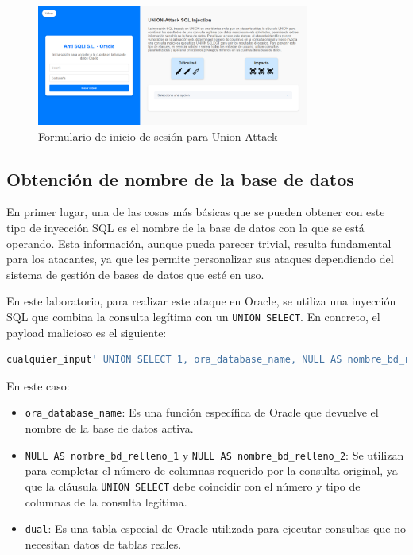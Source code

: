 \documentclass[a4paper,12pt]{article}
\begin{document}
\begin{figure}[H]
    \centering
    \includegraphics[width=0.8\textwidth]{Imagenes/union2.png}
    \caption{Formulario de inicio de sesión para Union Attack}
\end{figure}

\subsection{Obtención de nombre de la base de datos}
En primer lugar, una de las cosas más básicas que se pueden obtener con este tipo de inyección SQL es el nombre de la base de datos con la que se está operando. Esta información, aunque pueda parecer trivial, resulta fundamental para los atacantes, ya que les permite personalizar sus ataques dependiendo del sistema de gestión de bases de datos que esté en uso.

En este laboratorio, para realizar este ataque en Oracle, se utiliza una inyección SQL que combina la consulta legítima con un \texttt{UNION SELECT}. En concreto, el payload malicioso es el siguiente:

\begin{lstlisting}[language=SQL]
cualquier_input' UNION SELECT 1, ora_database_name, NULL AS nombre_bd_relleno_1, NULL AS nombre_bd_relleno_2 FROM dual --
\end{lstlisting}

En este caso:
\begin{itemize}
    \item \texttt{ora\_database\_name}: Es una función específica de Oracle que devuelve el nombre de la base de datos activa.
    \item \texttt{NULL AS nombre\_bd\_relleno\_1} y \texttt{NULL AS nombre\_bd\_relleno\_2}: Se utilizan para completar el número de columnas requerido por la consulta original, ya que la cláusula \texttt{UNION SELECT} debe coincidir con el número y tipo de columnas de la consulta legítima.
    \item \texttt{dual}: Es una tabla especial de Oracle utilizada para ejecutar consultas que no necesitan datos de tablas reales.
\end{itemize}
\end{document}
